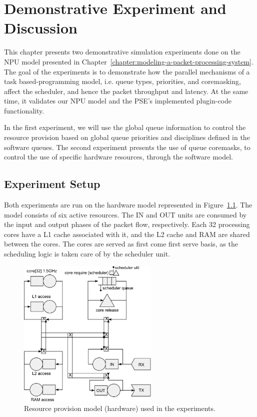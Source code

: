 \chapter{Demonstrative Experiment and Discussion}
\label{chapter:demonstrative-experiments}

This chapter presents two demonstrative simulation experiments done on the NPU model presented in Chapter~\ref{chapter:modeling-a-packet-processing-system}. The goal of the experiments is to demonstrate how the parallel mechanisms of a task based-programming model, i.e. queue types, priorities, and coremasking, affect the scheduler, and hence the packet throughput and latency. At the same time, it validates our NPU model and the PSE's implemented plugin-code functionality.

In the first experiment, we will use the global queue information to control the resource provision based on global queue priorities and disciplines defined in the software queues. The second experiment presents the use of queue coremasks, to control the use of specific hardware resources, through the software model.

\section{Experiment Setup}
\label{sec:experiment-setup}

Both experiments are run on the hardware model represented in Figure~\ref{fig:experiment-hardware}. The model consists of six active resources. The IN and OUT units are consumed by the input and output phases of the packet flow, respectively. Each 32 processing cores have a L1 cache associated with it, and the L2 cache and RAM are shared between the cores. The cores are served as first come first serve basis, as the scheduling logic is taken care of by the scheduler unit.

\begin{figure}[]
  \begin{center}
    \includegraphics[width=0.6\textwidth]{images/pse-models/experiment-hardware.pdf}
    \caption{Resource provision model (hardware) used in the experiments.}
    \label{fig:experiment-hardware}
  \end{center}
\end{figure}

